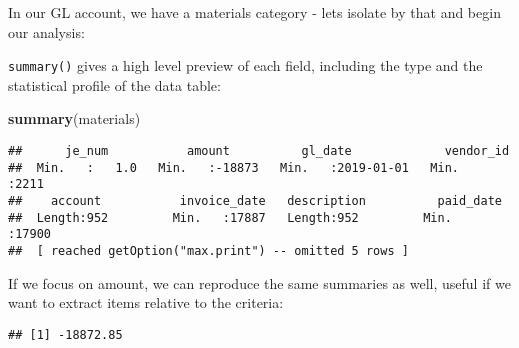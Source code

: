 \documentclass[
]{book}
\newenvironment{Shaded}{\begin{snugshade}}{\end{snugshade}}
\newcommand{\CommentTok}[1]{\textcolor[rgb]{0.56,0.35,0.01}{\textit{#1}}}
\newcommand{\DataTypeTok}[1]{\textcolor[rgb]{0.13,0.29,0.53}{#1}}
\newcommand{\KeywordTok}[1]{\textcolor[rgb]{0.13,0.29,0.53}{\textbf{#1}}}
\newcommand{\NormalTok}[1]{#1}
\newcommand{\OperatorTok}[1]{\textcolor[rgb]{0.81,0.36,0.00}{\textbf{#1}}}
\newcommand{\StringTok}[1]{\textcolor[rgb]{0.31,0.60,0.02}{#1}}
\begin{document}
In our GL account, we have a materials category - lets isolate by that and begin our analysis:

\begin{Shaded}
\end{Shaded}

\texttt{summary()} gives a high level preview of each field, including the type and the statistical profile of the data table:

\begin{Shaded}
\begin{Highlighting}[]
\KeywordTok{summary}\NormalTok{(materials)}
\end{Highlighting}
\end{Shaded}

\begin{verbatim}
##      je_num           amount          gl_date             vendor_id   
##  Min.   :   1.0   Min.   :-18873   Min.   :2019-01-01   Min.   :2211  
##    account           invoice_date   description          paid_date    
##  Length:952         Min.   :17887   Length:952         Min.   :17900  
##  [ reached getOption("max.print") -- omitted 5 rows ]
\end{verbatim}

If we focus on amount, we can reproduce the same summaries as well, useful if we want to extract items relative to the criteria:

\begin{Shaded}
\end{Shaded}

\begin{verbatim}
## [1] -18872.85
\end{verbatim}

\begin{Shaded}
\end{Shaded}
\end{document}
